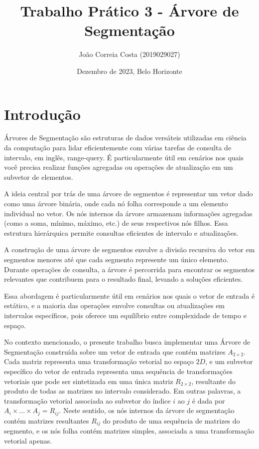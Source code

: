 \documentclass{article}
\title{Trabalho Prático 3 - Árvore de Segmentação}
\author{João Correia Costa (2019029027)}
\date{Dezembro de 2023, Belo Horizonte}
\begin{document}
\maketitle

\section{Introdução}

Árvores de Segmentação são estruturas de dados versáteis utilizadas em ciência da computação  para lidar eficientemente com várias tarefas de consulta de intervalo, em inglês, range-query. É particularmente útil em cenários nos quais você precisa realizar funções agregadas ou operações de atualização em um subvetor de elementos.

A ideia central por trás de uma árvore de segmentos é representar um vetor dado como uma árvore binária, onde cada nó folha corresponde a um elemento individual no vetor. Os nós internos da árvore armazenam informações agregadas (como a soma, mínimo, máximo, etc.) de seus respectivos nós filhos. Essa estrutura hierárquica permite consultas eficientes de intervalo e atualizações.

A construção de uma árvore de segmentos envolve a divisão recursiva do vetor em segmentos menores até que cada segmento represente um único elemento. Durante operações de consulta, a árvore é percorrida para encontrar os segmentos relevantes que contribuem para o resultado final, levando a soluções eficientes.

Essa abordagem é particularmente útil em cenários nos quais o vetor de entrada é estático, e a maioria das operações envolve consultas ou atualizações em intervalos específicos, pois oferece um equilíbrio entre complexidade de tempo e espaço.

No contexto mencionado, o presente trabalho busca implementar uma Árvore de Segmentação construída sobre um vetor de entrada que contém matrizes  \(A_{2 \times 2}\). Cada matriz representa uma transformação vetorial no espaço \(2D\), e um subvetor específico do vetor de entrada representa uma sequência de transformações vetoriais que pode ser sintetizada em uma única matriz \(R_{2 \times 2}\), resultante do produto de todas as matrizes no intervalo considerado. Em outras palavras, a transformação vetorial associada ao subvetor do índice \(i\) ao \(j\) é dada por \(A_i \times \ldots \times A_j = R_{ij}\). Neste sentido, os nós internos da árvore de segmentação contém matrizes resultantes  \(R_{ij}\) do produto de uma sequência de matrizes do segmento, e os nós folha contém matrizes simples, associada a uma transformação vetorial apenas.
\end{document}
